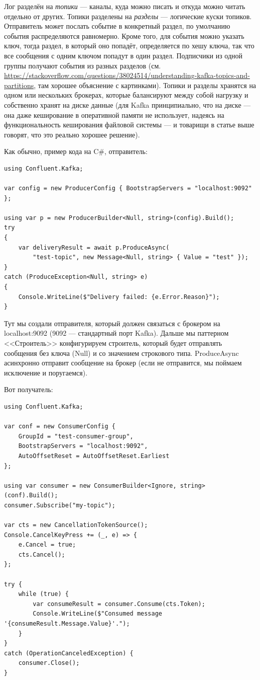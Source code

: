 \documentclass[a5paper]{article}
\begin{document}
Лог разделён на \emph{топики} --- каналы, куда можно писать и откуда можно читать отдельно от других. Топики разделены на \emph{разделы} --- логические куски топиков. Отправитель может послать событие в конкретный раздел, по умолчанию события распределяются равномерно. Кроме того, для события можно указать ключ, тогда раздел, в который оно попадёт, определяется по хешу ключа, так что все сообщения с одним ключом попадут в один раздел. Подписчики из одной группы получают события из разных разделов (см. \url{https://stackoverflow.com/questions/38024514/understanding-kafka-topics-and-partitions}, там хорошее объяснение с картинками). Топики и разделы хранятся на одном или нескольких брокерах, которые балансируют между собой нагрузку и собственно хранят на диске данные (для Kafka принципиально, что на диске --- она даже кеширование в оперативной памяти не использует, надеясь на функциональность кеширования файловой системы --- и товарищи в статье выше говорят, что это реально хорошее решение).

Как обычно, пример кода на C\#, отправитель:

\begin{verbatim}
using Confluent.Kafka;

var config = new ProducerConfig { BootstrapServers = "localhost:9092" };

using var p = new ProducerBuilder<Null, string>(config).Build();
try
{
    var deliveryResult = await p.ProduceAsync(
        "test-topic", new Message<Null, string> { Value = "test" });
}
catch (ProduceException<Null, string> e)
{
    Console.WriteLine($"Delivery failed: {e.Error.Reason}");
}
\end{verbatim}

Тут мы создали отправителя, который должен связаться с брокером на localhost:9092 (9092 --- стандартный порт Kafka). Дальше мы паттерном <<Строитель>> конфигурируем строитель, который будет отправлять сообщения без ключа (Null) и со значением строкового типа. ProduceAsync асинхронно отправит сообщение на брокер (если не отправится, мы поймаем исключение и поругаемся).

Вот получатель: 

\begin{verbatim}
using Confluent.Kafka;

var conf = new ConsumerConfig {
    GroupId = "test-consumer-group",
    BootstrapServers = "localhost:9092",
    AutoOffsetReset = AutoOffsetReset.Earliest
};

using var consumer = new ConsumerBuilder<Ignore, string>(conf).Build();
consumer.Subscribe("my-topic");

var cts = new CancellationTokenSource();
Console.CancelKeyPress += (_, e) => {
    e.Cancel = true;
    cts.Cancel();
};

try {
    while (true) {
        var consumeResult = consumer.Consume(cts.Token);
        Console.WriteLine($"Consumed message '{consumeResult.Message.Value}'.");
    }
}
catch (OperationCanceledException) {
    consumer.Close();
}
\end{verbatim}
\end{document}
